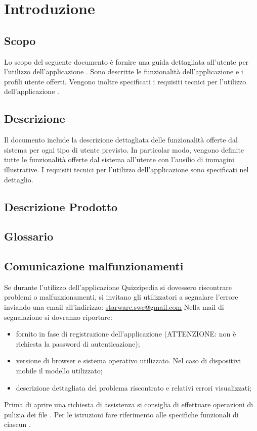\documentclass[12pt,a4paper]{article}
\begin{document}
	\newpage
	\tableofcontents
	\newpage
	\listoftables
	\listoffigures
	\newpage
	
	
	\section{Introduzione}	\label{intro}
	
	\subsection{Scopo}
	Lo scopo del seguente documento è fornire una guida dettagliata all’utente per l’utilizzo dell’applicazione \prj{}. Sono descritte le funzionalità dell'applicazione e i profili utente offerti.
	Vengono inoltre specificati i requisiti tecnici per l'utilizzo dell'applicazione \prj{}.

	\subsection{Descrizione}
    Il documento include la descrizione dettagliata delle funzionalità offerte dal sistema per ogni tipo di utente previsto. In particolar modo, vengono definite tutte le funzionalità offerte dal sistema all’utente con l’ausilio di immagini illustrative. 
    I requisiti tecnici per l'utilizzo dell'applicazione \prj{} sono specificati nel dettaglio.
	
	\subsection{Descrizione Prodotto}
	\descrizioneProdotto
	
	\subsection{Glossario}
	\glossarioPrint
	\subsection{Comunicazione malfunzionamenti}
	Se durante l’utilizzo dell’applicazione Quizzipedia si dovessero riscontrare problemi o
	malfunzionamenti, si invitano gli utilizzatori a segnalare l’errore inviando una email all’indirizzo:
	\url{starware.swe@gmail.com}
	Nella mail di segnalazione si dovranno riportare:
	\begin{itemize}
		\item {} fornito in fase di registrazione dell’applicazione (ATTENZIONE: non è richiesta la password di autenticazione);
		\item versione di browser e sistema operativo utilizzato. Nel caso di dispositivi mobile il modello utilizzato;
		\item descrizione dettagliata del problema riscontrato e relativi errori visualizzati;
	\end{itemize}
	Prima di aprire una richiesta di assistenza si consiglia di effettuare operazioni di pulizia dei file . Per le istruzioni fare riferimento alle specifiche funzionali di ciascun .
	
\end{document}
